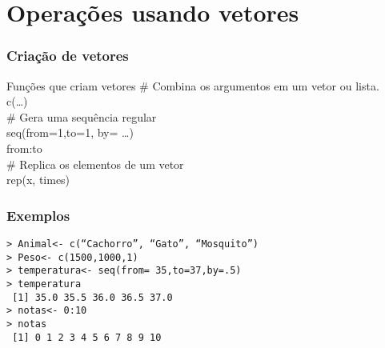 \documentclass{beamer}
\begin{document}
\section{Operações usando vetores}
\begin{frame}
  \frametitle{Criação de vetores}

  \begin{block}{Funções que criam vetores}
    \# Combina os argumentos em um vetor ou lista.\\
    c(\ldots) \\ \vspace{10pt} \pause
    \#  Gera uma sequência regular \\
    seq(from=1,to=1, by= \ldots)\\
    from:to \\\vspace{10pt} \pause
    \# Replica os elementos de um vetor \\
    rep(x, times)\\ 
  \end{block}
\end{frame}

\begin{frame}
  \frametitle{Exemplos}
\texttt{> Animal<- c(``Cachorro'', ``Gato'', ``Mosquito'')\\
> Peso<- c(1500,1000,1)\\ \vspace{10pt} \pause
> temperatura<- seq(from= 35,to=37,by=.5)\\
> temperatura\\
~[1] 35.0 35.5 36.0 36.5 37.0\\ \pause \vspace{10pt}
> notas<- 0:10 \\
> notas\\
 ~[1]  0  1  2  3  4  5  6  7  8  9 10\\ \vspace{10pt} \pause
}
\end{frame}
\end{document}
